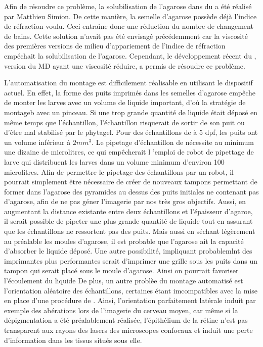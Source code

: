 \documentclass[\main/main.tex]{subfiles}
\begin{document}
%
Afin de résoudre ce problème, la solubilisation de l'agarose dans du \MD{} a été réalisé par Matthieu Simion.
%
De cette manière, la semelle d'agarose possède déjà l'indice de réfraction voulu.
%
Ceci entraîne donc une réduction du nombre de changement de bains.
Cette solution n'avait pas été envisagé précédemment car la viscosité des premières versions de milieu d'appariement de l'indice de réfraction empéchait la solubilisation de l'agarose.
%
Cependant, le développement récent du \MD{}, version du MD ayant une viscosité réduire, a permis de résoudre ce problème.

L'automatisation du montage est difficilement réalisable en utilisant le dispositif actuel.
%
En effet,
la forme des puits imprimés dans les semelles d'agarose empêche de monter les larves avec un volume de liquide important, d'où la stratégie de montageb avec un pinceau.
%
Si une trop grande quantité de liquide était déposé en même temps que l'échantillon,
l'échantillon risquerait de sortir de son puit ou d'être mal stabilisé par le phytagel.
%
Pour des échantillons de \pz{} à 5 dpf, les puits ont un volume inférieur à $2 mm^{3}$. 
%
Le pipetage d'échantillon de \pz{} nécessite au minimum une dizaine de microlitres, ce qui empêcherait l 'emploi de robot de pipettage de larve qui distribuent les larves dans un volume minimum d'environ 100 microlitres.
%
Afin de permettre le pipetage des échantillons par un robot, il pourrait simplement être nécessaire de créer de nouveaux tampons permettant de former dans l'agarose des pyramides au dessus des puits initiales ne contenant pas d'agarose, afin de ne pas géner l'imagerie par nos très gros objectifs.
%
Aussi, en augmentant la distance existante entre deux échantillons et l'épaisseur d'agaroe,
il serait possible de pipeter une plus grande quantité de liquide tout en assurant que les échantillons ne ressortent pas des puits. Mais aussi en séchant légèrement au préalable les moules d'agarose, il est probable que l'agarose ait la capacité d'absorber le liquide déposé. Une autre possibilité, impliquant probablemlnt des imprimantes plus performantes serait d'imprimer une grille sous les puits dans un tampon qui serait placé sous le moule d'agarose. Ainsi on pourrait favoriser l'écoulement du liquide
%
%
De plus, un autre problèe du montage automatisé est l'orientation aléatoire des échantillons, certaines étant imcompatibles avec la mise en place d'une procédure de \hcs{}.
%
Ainsi, l'orientation parfaitement latérale induit par exemple des abérations lors de l'imagerie du cerveau moyen, car même si la dépigmentation a été préalablement réalisée, l'épithélium de la rétine n'est pas transparent aux rayons des lasers des microscopes confocaux et induit une perte d'information dans les tissus situés sous elle.
\end{document}
